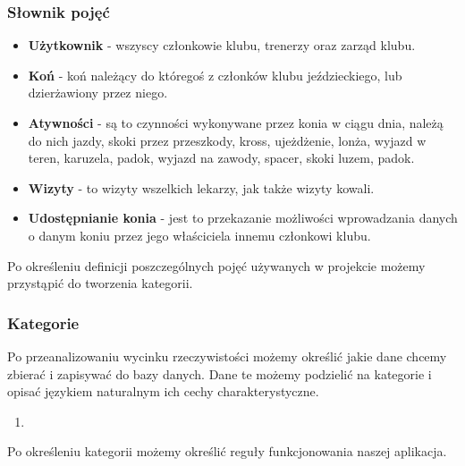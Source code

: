 \documentclass[12pt,twoside]{report}
\begin{document}
\subsubsection{Słownik pojęć}
\begin{itemize}
	\item \textbf{Użytkownik} - wszyscy członkowie klubu, trenerzy oraz zarząd klubu.
	\item \textbf{Koń} - koń należący do któregoś z członków klubu jeździeckiego, lub dzierżawiony przez niego.
	\item \textbf{Atywności} - są to czynności wykonywane przez konia w ciągu dnia, należą do nich jazdy, skoki przez przeszkody, kross, ujeżdżenie, lonża, wyjazd w teren, karuzela, padok, wyjazd na zawody, spacer, skoki luzem, padok.
	\item \textbf{Wizyty} - to wizyty wszelkich lekarzy, jak także wizyty kowali.
	\item \textbf{Udostępnianie konia} - jest to przekazanie możliwości wprowadzania danych o danym koniu przez jego właściciela innemu członkowi klubu.
\end{itemize}
Po określeniu definicji poszczególnych pojęć używanych w projekcie możemy przystąpić do tworzenia kategorii.
\subsubsection{Kategorie}
Po przeanalizowaniu wycinku rzeczywistości możemy określić jakie dane chcemy zbierać i zapisywać do bazy danych. Dane te możemy podzielić na kategorie i opisać językiem naturalnym ich cechy charakterystyczne.
\begin{enumerate}[start=1,label={\bfseries KAT:\arabic*}]
	\item 
\end{enumerate}
Po określeniu kategorii możemy określić reguły funkcjonowania naszej aplikacja.
\end{document}
